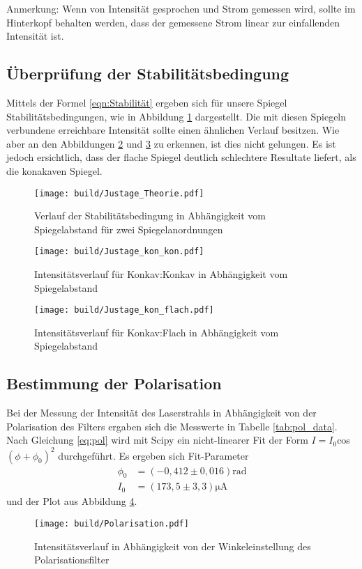 Anmerkung: Wenn von Intensität gesprochen und Strom gemessen wird, sollte im Hinterkopf behalten werden, dass der gemessene Strom linear zur einfallenden Intensität ist.

\subsection{Überprüfung der Stabilitätsbedingung}
Mittels der Formel \eqref{eqn:Stabilität} ergeben sich für unsere Spiegel Stabilitätsbedingungen, wie in Abbildung \ref{fig:Stabilität_Theorie} dargestellt. 
Die mit diesen Spiegeln verbundene erreichbare Intensität sollte einen ähnlichen Verlauf besitzen.
Wie aber an den Abbildungen \ref{fig:Stabilität_kon_kon} und \ref{fig:Stabilität_kon_flach} zu erkennen, ist dies nicht gelungen.
Es ist jedoch ersichtlich, dass der flache Spiegel deutlich schlechtere Resultate liefert, als die konakaven Spiegel.

\begin{figure}
  \centering
  \texttt{[image: build/Justage\_Theorie.pdf]}
  \caption{Verlauf der Stabilitätsbedingung in Abhängigkeit vom Spiegelabstand für zwei Spiegelanordnungen}
  \label{fig:Stabilität_Theorie}
\end{figure}


\begin{figure}
  \centering
  \texttt{[image: build/Justage\_kon\_kon.pdf]}
  \caption{Intensitätsverlauf für Konkav:Konkav in Abhängigkeit vom Spiegelabstand}
  \label{fig:Stabilität_kon_kon}
\end{figure}

\begin{figure}
  \centering
  \texttt{[image: build/Justage\_kon\_flach.pdf]}
  \caption{Intensitätsverlauf für Konkav:Flach in Abhängigkeit vom Spiegelabstand}
  \label{fig:Stabilität_kon_flach}
\end{figure}

\subsection{Bestimmung der Polarisation}
Bei der Messung der Intensität des Laserstrahls in Abhängigkeit von der Polarisation des Filters ergaben sich die
Messwerte in Tabelle \ref{tab:pol_data}.
Nach Gleichung \ref{eq:pol} wird mit Scipy \cite{scipy} ein nicht-linearer Fit der Form $I = I_0$cos$(\phi+\phi_0)^2$ durchgeführt.
Es ergeben sich Fit-Parameter
\begin{align}
  \phi_0&=(-0,412\pm 0,016)\si{\radian}\nonumber\\
  I_0&=(173,5\pm 3,3)\si{\micro\ampere}\label{eqn:Parameter_Polarisation}
\end{align}
und der Plot aus Abbildung \ref{fig:Polarisation}.
\begin{figure}
  \centering
  \texttt{[image: build/Polarisation.pdf]}
  \caption{Intensitätsverlauf in Abhängigkeit von der Winkeleinstellung des Polarisationsfilter}
  \label{fig:Polarisation}
\end{figure}

